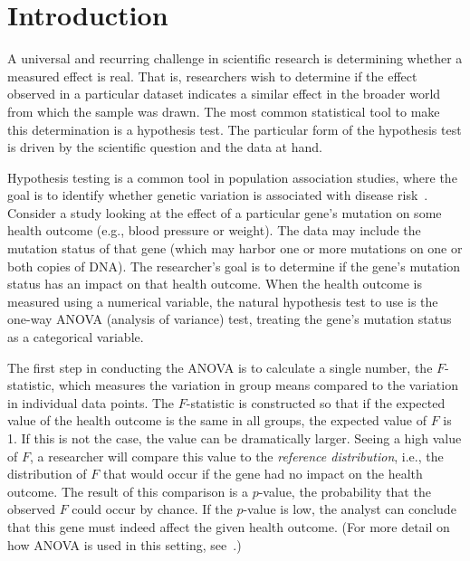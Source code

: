 \section{Introduction}

A universal and recurring challenge in scientific research is determining whether a measured effect is real.  That is, researchers wish to determine if the effect observed in a particular dataset indicates a similar effect in the broader world from which the sample was drawn. The most common statistical tool to make this determination is a hypothesis test.
The particular form of the hypothesis test is driven by the scientific question and the data at hand. 

Hypothesis testing is a common tool in population association studies, where the goal is to identify whether genetic variation is associated with disease risk~\cite{balding2006tutorial}.  Consider a study looking at the effect of a particular gene's mutation on some health outcome (e.g., blood pressure or weight).  The data may include the mutation status of that gene (which may harbor one or more mutations on one or both copies of DNA).  
The researcher's goal is to determine if the gene's mutation status has an impact on that health outcome.  When the health outcome is measured using a numerical variable, the natural hypothesis test to use is the one-way ANOVA (analysis of variance) test, treating the gene's mutation status as a categorical variable.

The first step in conducting the ANOVA is to calculate a single number, the $F$-statistic, which measures the variation in group means compared to the variation in individual data points. The $F$-statistic is constructed so that if the expected value of the health outcome is the same in all groups, the expected value of $F$ is 1.  If this is not the case, the value can be dramatically larger.  Seeing a high value of $F$, a researcher will compare this value to the \textit{reference distribution}, i.e., the distribution of $F$ that would occur if the gene had no impact on the health outcome.  The result of this comparison is a $p$-value, the probability that the observed $F$ could occur by chance.  If the $p$-value is low, the analyst can conclude that this gene must indeed affect the given health outcome.  (For more detail on how ANOVA is used in this setting, see~\cite{myers2003researchdesign}.)

